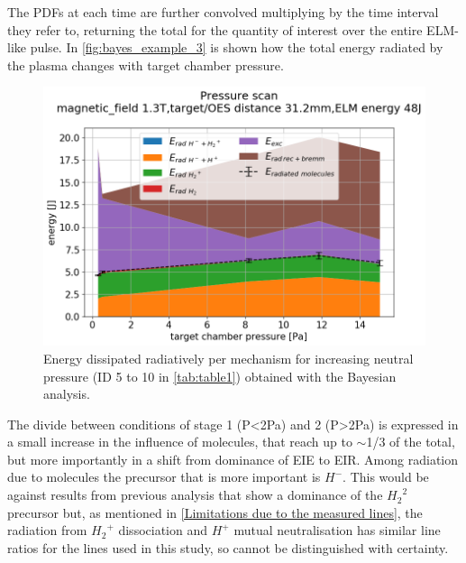 The PDFs at each time are further convolved multiplying by the time interval they refer to, returning the total for the quantity of interest over the entire ELM-like pulse. In \autoref{fig:bayes_example_3} is shown how the total energy radiated by the plasma changes with target chamber pressure.
\begin{figure}
	\centering
	\includegraphics[width=0.7\linewidth,trim={0 0 30 60},clip]{Chapters/chapter3/figs/Bayesian_strong_4.png}
	\caption{Energy dissipated radiatively per mechanism for increasing neutral pressure (ID 5 to 10 in \autoref{tab:table1}) obtained with the Bayesian analysis.}
	\label{fig:bayes_example_3}
\end{figure}
The divide between conditions of stage 1 (P<2Pa) and 2 (P>2Pa) is expressed in a small increase in the influence of molecules, that reach up to $\sim$1/3 of the total, but more importantly in a shift from dominance of EIE to EIR. Among radiation due to molecules the precursor that is more important is $H^-$. This would be against results from previous analysis that show a dominance of the ${H_2}^2$ precursor\cite{Akkermans2020} but, as mentioned in \autoref{Limitations due to the measured lines}, the radiation from ${H_2}^+$ dissociation and $H^+$ mutual neutralisation has similar line ratios for the lines used in this study, so cannot be distinguished with certainty.

